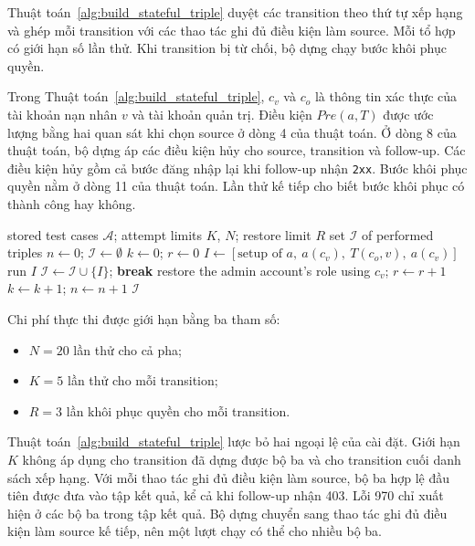 Thuật toán~\ref{alg:build_stateful_triple} duyệt các transition theo thứ tự xếp hạng và ghép mỗi transition với các thao tác ghi đủ điều kiện làm source. Mỗi tổ hợp có giới hạn số lần thử. Khi transition bị từ chối, bộ dựng chạy bước khôi phục quyền.

Trong Thuật toán~\ref{alg:build_stateful_triple}, $c_v$ và $c_o$ là thông tin xác thực của tài khoản nạn nhân $v$ và tài khoản quản trị. Điều kiện $\mathit{Pre}(a, T)$ được ước lượng bằng hai quan sát khi chọn source ở dòng 4 của thuật toán. Ở dòng 8 của thuật toán, bộ dựng áp các điều kiện hủy cho source, transition và follow-up. Các điều kiện hủy gồm cả bước đăng nhập lại khi follow-up nhận \texttt{2xx}. Bước khôi phục quyền nằm ở dòng 11 của thuật toán. Lần thử kế tiếp cho biết bước khôi phục có thành công hay không.

\begin{algorithm}[htbp]
\caption{Dựng kịch bản kiểm thử MR-A1}
\label{alg:build_stateful_triple}
\begin{algorithmic}[1]
\Require stored test cases $\mathcal{A}$; attempt limits $K$, $N$; restore limit $R$
\Ensure set $\mathcal{I}$ of performed triples
\State $n \gets 0$; $\mathcal{I} \gets \emptyset$
    \State $k \gets 0$; $r \gets 0$
            \State $I \gets [\text{setup of } a,\ a(c_v),\ T(c_o, v),\ a(c_v)]$
            \State run $I$
                \State $\mathcal{I} \gets \mathcal{I} \cup \{I\}$; \textbf{break} 
                \State restore the admin account's role using $c_v$; $r \gets r + 1$
            \EndIf
            \State $k \gets k + 1$; $n \gets n + 1$
        \EndWhile
    \EndFor
\EndFor
\State \Return $\mathcal{I}$
\end{algorithmic}
\end{algorithm}

Chi phí thực thi được giới hạn bằng ba tham số:
\begin{itemize}
    \item $N = 20$ lần thử cho cả pha;
    \item $K = 5$ lần thử cho mỗi transition;
    \item $R = 3$ lần khôi phục quyền cho mỗi transition.
\end{itemize}
Thuật toán~\ref{alg:build_stateful_triple} lược bỏ hai ngoại lệ của cài đặt. Giới hạn $K$ không áp dụng cho transition đã dựng được bộ ba và cho transition cuối danh sách xếp hạng. Với mỗi thao tác ghi đủ điều kiện làm source, bộ ba hợp lệ đầu tiên được đưa vào tập kết quả, kể cả khi follow-up nhận 403. Lỗi 970 chỉ xuất hiện ở các bộ ba trong tập kết quả. Bộ dựng chuyển sang thao tác ghi đủ điều kiện làm source kế tiếp, nên một lượt chạy có thể cho nhiều bộ ba.

